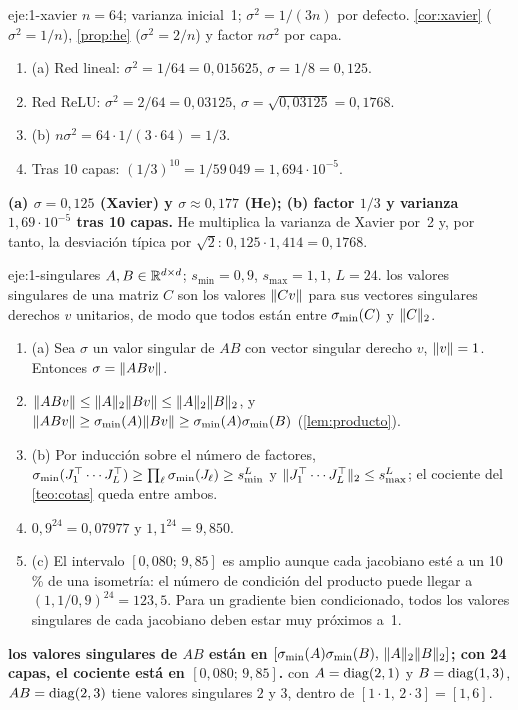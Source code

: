 \begin{solucion}{eje:1-xavier}
\datos $n=64$; varianza inicial~1; $\sigma^{2}=1/(3n)$ por defecto.
\planteamiento \cref{cor:xavier} ($\sigma^{2}=1/n$), \cref{prop:he} ($\sigma^{2}=2/n$) y factor $n\sigma^{2}$ por capa.
\pasos
\begin{enumerate}[label=\arabic*.]
  \item (a) Red lineal: $\sigma^{2}=1/64=0{,}015625$, $\sigma=1/8=0{,}125$.
  \item Red ReLU: $\sigma^{2}=2/64=0{,}03125$, $\sigma=\sqrt{0{,}03125}=0{,}1768$.
  \item (b) $n\sigma^{2}=64\cdot 1/(3\cdot 64)=1/3$.
  \item Tras 10 capas: $(1/3)^{10}=1/59\,049=1{,}694\cdot 10^{-5}$.
\end{enumerate}
\resultado \textbf{(a) $\sigma=0{,}125$ (Xavier) y $\sigma\approx 0{,}177$ (He); (b) factor $1/3$ y varianza $1{,}69\cdot 10^{-5}$ tras 10 capas.}
\comprobacion He multiplica la varianza de Xavier por~2 y, por tanto, la desviación típica por $\sqrt2$: $0{,}125\cdot 1{,}414=0{,}1768$.
\end{solucion}

\begin{solucion}{eje:1-singulares}
\datos $A,B\in\mathbb{R}^{d\times d}$; $s_{\min}=0{,}9$, $s_{\max}=1{,}1$, $L=24$.
\planteamiento los valores singulares de una matriz $C$ son los valores $\lVert Cv\rVert$ para sus vectores singulares derechos $v$ unitarios, de modo que todos están entre $\sigma_{\min}(C)$ y $\lVert C\rVert_2$.
\pasos
\begin{enumerate}[label=\arabic*.]
  \item (a) Sea $\sigma$ un valor singular de $AB$ con vector singular derecho $v$, $\lVert v\rVert=1$. Entonces $\sigma=\lVert ABv\rVert$.
  \item $\lVert ABv\rVert\le\lVert A\rVert_2\lVert Bv\rVert\le\lVert A\rVert_2\lVert B\rVert_2$, y $\lVert ABv\rVert\ge\sigma_{\min}(A)\lVert Bv\rVert\ge\sigma_{\min}(A)\sigma_{\min}(B)$ (\cref{lem:producto}).
  \item (b) Por inducción sobre el número de factores, $\sigma_{\min}(J_1^{\top}\cdots J_L^{\top})\ge\prod_\ell\sigma_{\min}(J_\ell)\ge s_{\min}^{L}$ y $\lVert J_1^{\top}\cdots J_L^{\top}\rVert_2\le s_{\max}^{L}$; el cociente del \cref{teo:cotas} queda entre ambos.
  \item $0{,}9^{24}=0{,}07977$ y $1{,}1^{24}=9{,}850$.
  \item (c) El intervalo $[0{,}080;\,9{,}85]$ es amplio aunque cada jacobiano esté a un 10\,\% de una isometría: el número de condición del producto puede llegar a $(1{,}1/0{,}9)^{24}=123{,}5$. Para un gradiente bien condicionado, todos los valores singulares de cada jacobiano deben estar muy próximos a~1.
\end{enumerate}
\resultado \textbf{los valores singulares de $AB$ están en $[\sigma_{\min}(A)\sigma_{\min}(B),\,\lVert A\rVert_2\lVert B\rVert_2]$; con 24 capas, el cociente está en $[0{,}080;\,9{,}85]$.}
\comprobacion con $A=\operatorname{diag}(2,1)$ y $B=\operatorname{diag}(1,3)$, $AB=\operatorname{diag}(2,3)$ tiene valores singulares $2$ y $3$, dentro de $[1\cdot 1,\,2\cdot 3]=[1,6]$.
\end{solucion}

